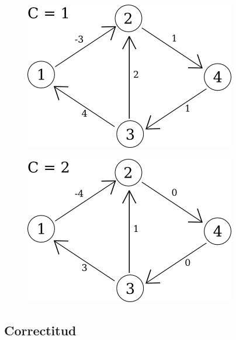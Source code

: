 \begin{figure}[H]
	\centering
	\begin{minipage}[b]{0.45\textwidth}
		\includegraphics[width=\textwidth]{imagenes/problema2/prob2_caso3_c1.png} \\
	\end{minipage}
	\hfill
	\begin{minipage}[b]{0.45\textwidth}
		\includegraphics[width=\textwidth]{imagenes/problema2/prob2_caso3_c2.png} \\
	\end{minipage}
\end{figure}


\subsection{Correctitud}

